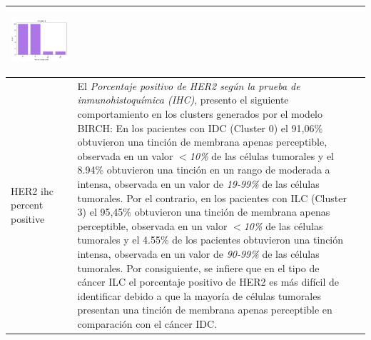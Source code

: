 \begin{table}[htb!]
\begin{threeparttable}
\begin{tabular}{p{2.5cm} p{7cm} p{6.5cm}}
			\begin{center}\includegraphics[width=1\linewidth]{NOTEBOOK/IMAGENES_BIRCH_CLUSTERING/4_Cluster_3_tumor_stage_code}\end{center}
			
			\\ \hline
			HER2 ihc percent positive
			& El \textit{Porcentaje positivo de HER2 según la prueba de inmunohistoquímica (IHC)}, presento el siguiente comportamiento en los clusters generados por el modelo BIRCH: En los pacientes con IDC (Cluster 0) el 91,06\% obtuvieron una tinción de membrana apenas perceptible, observada en un valor $<$\textit{10\%} de las células tumorales y el 8.94\% obtuvieron una tinción en un rango de moderada a intensa, observada en un valor de \textit{19-99\%} de las células tumorales. Por el contrario, en los pacientes con ILC (Cluster 3) el 95,45\%  obtuvieron una tinción de membrana apenas perceptible, observada en un valor $<$\textit{10\%} de las células tumorales y el 4.55\% de los pacientes obtuvieron una tinción intensa, observada en un valor de \textit{90-99\%} de las células tumorales. Por consiguiente, se infiere que en el tipo de cáncer ILC el porcentaje positivo de HER2 es más difícil de identificar debido a que la mayoría de células tumorales presentan una tinción de membrana apenas perceptible en comparación con el cáncer IDC.
			

\end{tabular}
\end{threeparttable}
\end{table}
